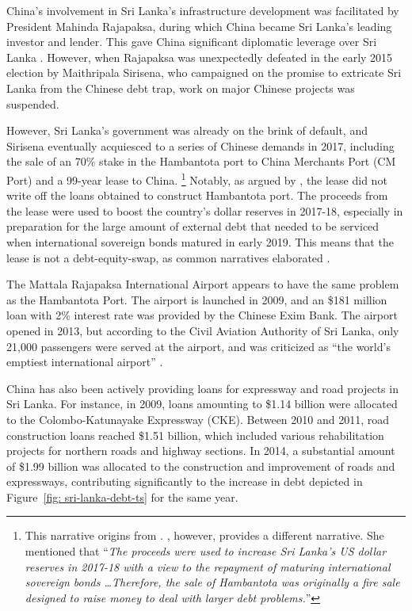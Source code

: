 China's involvement in Sri Lanka's infrastructure development was facilitated by President Mahinda Rajapaksa, during which China became Sri Lanka's leading investor and lender. This gave China significant diplomatic leverage over Sri Lanka \citep*{Chellaney_2017}.
However, when Rajapaksa was unexpectedly defeated in the early 2015 election by Maithripala Sirisena, who campaigned on the promise to extricate Sri Lanka from the Chinese debt trap, work on major Chinese projects was suspended.

However, Sri Lanka's government was already on the brink of default, and Sirisena eventually acquiesced to a series of Chinese demands in 2017, including the sale of an 70\% stake in the Hambantota port to China Merchants Port (CM Port) and a 99-year lease to China.%
\footnote{
    This narrative origins from \citet*{Chellaney_2017}. \citet*{Brautigam-meme-2020}, however, provides a different narrative. She mentioned that ``\emph{The proceeds were used to increase Sri Lanka's
    US dollar reserves in 2017-18 with a view to the repayment of maturing international sovereign bonds \dots Therefore, the sale of Hambantota was originally a fire sale designed to raise money to deal
    with larger debt problems.}''
}
Notably, as argued by \citet*{Moramudali_2019}, the lease did not write off the loans obtained to construct Hambantota port. The proceeds from the lease were used to boost the country's dollar reserves in 2017-18, especially in preparation for the large amount of external debt that needed to be serviced when international sovereign bonds matured in early 2019. This means that the lease is not a debt-equity-swap, as common narratives elaborated \citep*{Moramudali_2020}.

The Mattala Rajapaksa International Airport appears to have the same problem as the Hambantota Port. The airport is launched in 2009, and an \$181 million loan with 2\% interest rate was provided by the Chinese Exim Bank. The airport opened in 2013, but according to the Civil Aviation Authority of Sri Lanka, only 21,000 passengers were served at the airport, and was criticized as ``the world's emptiest international airport'' \citep*{shepard-16-airport-empty}.

China has also been actively providing loans for expressway and road projects in Sri Lanka. For instance, in 2009, loans amounting to \$1.14 billion were allocated to the Colombo-Katunayake Expressway (CKE). Between 2010 and 2011, road construction loans reached \$1.51 billion, which included various rehabilitation projects for northern roads and highway sections. In 2014, a substantial amount of \$1.99 billion was allocated to the construction and improvement of roads and expressways, contributing significantly to the increase in debt depicted in Figure~\ref{fig: sri-lanka-debt-ts} for the same year.

